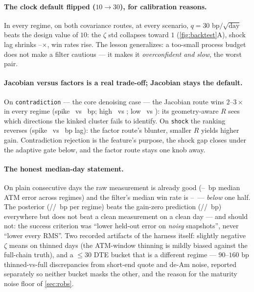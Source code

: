 \documentclass[11pt]{article}
\begin{document}
\paragraph{The clock default flipped ($10\to30$), for calibration
reasons.}  In every regime, on both covariance routes, at every
scenario, $q=30$ bp$/\sqrt{\text{day}}$ beats the design value of
$10$: the $\zeta$ std collapses toward $1$ (\cref{fig:backtest}A),
shock lag shrinks
\ktrshockimprovemin--\ktrshockimprovemax$\times$, win rates rise.  The
lesson generalizes: a too-small process budget does not make a filter
cautious --- it makes it \emph{overconfident and slow}, the worst pair.

\paragraph{Jacobian versus factors is a real trade-off; Jacobian stays
the default.}  On \texttt{contradiction} --- the core denoising case
--- the Jacobian route wins $2$--$3\times$ in every regime (spike
\ktrcontrajacspike\ vs \ktrcontrafacspike\ bp; high
\ktrcontrajachigh\ vs \ktrcontrafachigh; low \ktrcontrajaclow\ vs
\ktrcontrafaclow): its geometry-aware $R$ sees which directions the
kinked cluster fails to identify.  On \texttt{shock} the ranking
reverses (spike \ktrshockjacspike\ vs \ktrshockfacspike\ bp lag): the
factor route's blunter, smaller $R$ yields higher gain.  Contradiction
rejection is the feature's purpose, the shock gap closes under the
adaptive gate below, and the factor route stays one knob away.

\paragraph{The honest median-day statement.}  On plain consecutive days
the raw measurement is already good
(\ktrerrmeaslow--\ktrerrmeashigh\ bp median ATM error across regimes)
and the filter's median win rate is
\ktrwinspike--\ktrwinhigh\ --- \emph{below} one half.  The posterior
(\ktrerrpostspike/\ktrerrposthigh/\ktrerrpostlow\ bp per regime) beats
the gain-zero prediction
(\ktrerrpredspike/\ktrerrpredhigh/\ktrerrpredlow\ bp) everywhere but
does not beat a clean measurement on a clean day --- and should not:
the success criterion was ``lower held-out error on \emph{noisy}
snapshots'', never ``lower every RMS''.  Two recorded artifacts of the
harness itself: slightly negative $\zeta$ means on thinned days (the
ATM-window thinning is mildly biased against the full-chain truth), and
a $\le30$ DTE bucket that is a different regime --- $90$--$160$ bp
thinned-vs-full discrepancies from short-end quote and de-Am noise,
reported separately so neither bucket masks the other, and the reason
for the maturity noise floor of \cref{sec:robs}.
\end{document}

